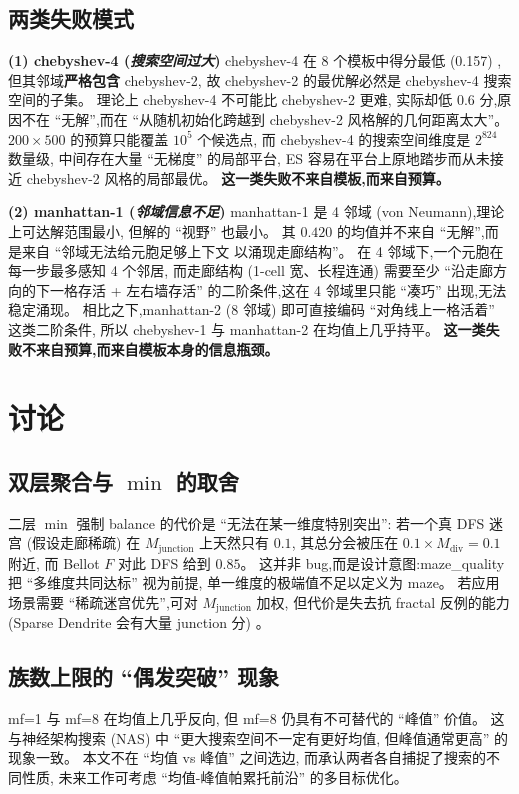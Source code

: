 \documentclass[11pt,a4paper]{article}
\begin{document}
\subsection{两类失败模式}
\textbf{(1) chebyshev-4 (\textit{搜索空间过大})}
chebyshev-4 在 8 个模板中得分最低 (0.157) ,
但其邻域\textbf{严格包含} chebyshev-2,
故 chebyshev-2 的最优解必然是 chebyshev-4 搜索空间的子集。
理论上 chebyshev-4 不可能比 chebyshev-2 更难,
实际却低 $0.6$ 分,原因不在 ``无解'',而在
``从随机初始化跨越到 chebyshev-2 风格解的几何距离太大''。
$200 \times 500$ 的预算只能覆盖 $10^5$ 个候选点,
而 chebyshev-4 的搜索空间维度是 $2^{824}$ 数量级,
中间存在大量 ``无梯度'' 的局部平台,
ES 容易在平台上原地踏步而从未接近 chebyshev-2 风格的局部最优。
\textbf{这一类失败不来自模板,而来自预算。}

\textbf{(2) manhattan-1 (\textit{邻域信息不足})}
manhattan-1 是 4 邻域 (von Neumann),理论上可达解范围最小,
但解的 ``视野'' 也最小。
其 $0.420$ 的均值并不来自 ``无解'',而是来自 ``邻域无法给元胞足够上下文
以涌现走廊结构''。
在 4 邻域下,一个元胞在每一步最多感知 4 个邻居,
而走廊结构 (1-cell 宽、长程连通) 需要至少 ``沿走廊方向的下一格存活 + 左右墙存活''
的二阶条件,这在 4 邻域里只能 ``凑巧'' 出现,无法稳定涌现。
相比之下,manhattan-2 (8 邻域) 即可直接编码 ``对角线上一格活着'' 这类二阶条件,
所以 chebyshev-1 与 manhattan-2 在均值上几乎持平。
\textbf{这一类失败不来自预算,而来自模板本身的信息瓶颈。}

\section{讨论}
\subsection{双层聚合与 $\min$ 的取舍}
二层 $\min$ 强制 balance 的代价是 ``无法在某一维度特别突出'':
若一个真 DFS 迷宫 (假设走廊稀疏) 在 $M_{\text{junction}}$ 上天然只有 $0.1$,
其总分会被压在 $0.1 \times M_{\text{div}} = 0.1$ 附近,
而 Bellot $F$ 对此 DFS 给到 $0.85$。
这并非 bug,而是设计意图:maze\_quality 把 ``多维度共同达标'' 视为前提,
单一维度的极端值不足以定义为 maze。
若应用场景需要 ``稀疏迷宫优先'',可对 $M_{\text{junction}}$ 加权,
但代价是失去抗 fractal 反例的能力 (Sparse Dendrite 会有大量 junction 分) 。

\subsection{族数上限的 ``偶发突破'' 现象}
mf=1 与 mf=8 在均值上几乎反向,
但 mf=8 仍具有不可替代的 ``峰值'' 价值。
这与神经架构搜索 (NAS) 中 ``更大搜索空间不一定有更好均值, 但峰值通常更高'' 的现象一致。
本文不在 ``均值 vs 峰值'' 之间选边,
而承认两者各自捕捉了搜索的不同性质,
未来工作可考虑 ``均值-峰值帕累托前沿'' 的多目标优化。
\end{document}
